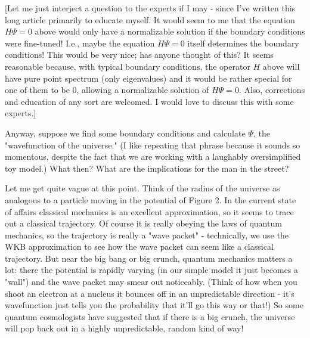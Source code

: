 [Let me just interject a question to the experts if I may - since I've written this long article primarily to educate myself. It would seem to me that the equation $H\Psi = 0$ above would only have a normalizable solution if the boundary conditions were fine-tuned! I.e., maybe the equation $H\Psi = 0$ itself determines the boundary conditions! This would be very nice; has anyone thought of this? It seems reasonable because, with typical boundary conditions, the operator $H$ above will have pure point spectrum (only eigenvalues) and it would be rather special for one of them to be 0, allowing a normalizable solution of $H\Psi = 0$. Also, corrections and education of any sort are welcomed. I would love to discuss this with some experts.]

Anyway, suppose we find some boundary conditions and calculate $\Psi$, the "wavefunction of the universe." (I like repeating that phrase because it sounds so momentous, despite the fact that we are working with a laughably oversimplified toy model.) What then? What are the implications for the man in the street?

Let me get quite vague at this point. Think of the radius of the universe as analogous to a particle moving in the potential of Figure 2. In the current state of affairs classical mechanics is an excellent approximation, so it seems to trace out a classical trajectory. Of course it is really obeying the laws of quantum mechanics, so the trajectory is really a "wave packet" - technically, we use the WKB approximation to see how the wave packet can seem like a classical trajectory. But near the big bang or big crunch, quantum mechanics matters a lot: there the potential is rapidly varying (in our simple model it just becomes a "wall") and the wave packet may smear out noticeably. (Think of how when you shoot an electron at a nucleus it bounces off in an unpredictable direction - it's wavefunction just tells you the probability that it'll go this way or that!) So some quantum cosmologists have suggested that if there is a big crunch, the universe will pop back out in a highly unpredictable, random kind of way!

